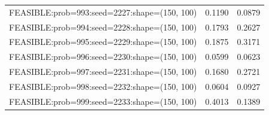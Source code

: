 \begin{longtable}{lcc}
FEASIBLE:prob=993:seed=2227:shape=(150, 100) &   0.1190 & 0.0879 \\
FEASIBLE:prob=994:seed=2228:shape=(150, 100) &   0.1793 & 0.2627 \\
FEASIBLE:prob=995:seed=2229:shape=(150, 100) &   0.1875 & 0.3171 \\
FEASIBLE:prob=996:seed=2230:shape=(150, 100) &   0.0599 & 0.0623 \\
FEASIBLE:prob=997:seed=2231:shape=(150, 100) &   0.1680 & 0.2721 \\
FEASIBLE:prob=998:seed=2232:shape=(150, 100) &   0.0604 & 0.0927 \\
FEASIBLE:prob=999:seed=2233:shape=(150, 100) &   0.4013 & 0.1389 \\
\end{longtable}
